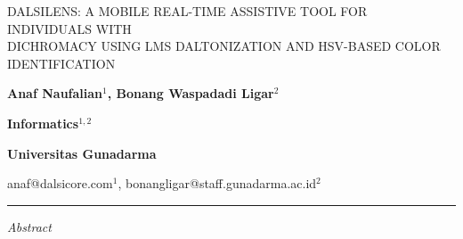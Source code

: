 
\renewcommand{\figurename}{Figure}
\renewcommand{\tablename}{Table}

\begin{center}
  {\bfseries\fontsize{14}{14}\selectfont
  \parbox{1\textwidth}{%
    \centering
    \linespread{1.4}\selectfont
    DALSILENS: A MOBILE REAL-TIME ASSISTIVE TOOL FOR INDIVIDUALS WITH\\
    DICHROMACY USING LMS DALTONIZATION AND HSV-BASED COLOR IDENTIFICATION
  }}

  \vspace{0.8em}
  {\fontsize{12}{14}\selectfont\bfseries Anaf Naufalian$^{1}$, Bonang Waspadadi Ligar$^{2}$}

  \vspace{0.5em}
  {\fontsize{11}{13}\selectfont\bfseries Informatics$^{1,2}$}

  \vspace{0.3em}
  {\fontsize{11}{13}\selectfont\bfseries Universitas Gunadarma}

  \vspace{0.3em}
  {\fontsize{10}{12}\selectfont anaf@dalsicore.com$^{1}$, bonangligar@staff.gunadarma.ac.id$^{2}$}
\end{center}

\vspace{0.6em}
\hrule
\vspace{0.8em}

\begin{center}
  {\itshape\fontsize{12}{14}\selectfont Abstract}
\end{center}

